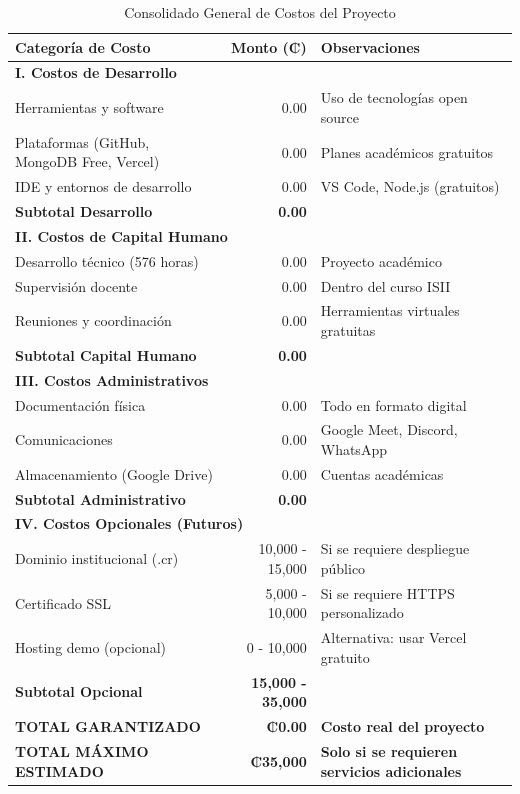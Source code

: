 \begin{table}[H]
\centering
\begin{tabular}{|l|r|p{5cm}|}
\hline
\textbf{Categoría de Costo} & \textbf{Monto (₡)} & \textbf{Observaciones} \\
\hline
\hline
\multicolumn{3}{|l|}{\textbf{I. Costos de Desarrollo}} \\
\hline
Herramientas y software & 0.00 & Uso de tecnologías open source \\
Plataformas (GitHub, MongoDB Free, Vercel) & 0.00 & Planes académicos gratuitos \\
IDE y entornos de desarrollo & 0.00 & VS Code, Node.js (gratuitos) \\
\hline
\textbf{Subtotal Desarrollo} & \textbf{0.00} & \\
\hline
\hline
\multicolumn{3}{|l|}{\textbf{II. Costos de Capital Humano}} \\
\hline
Desarrollo técnico (576 horas) & 0.00 & Proyecto académico \\
Supervisión docente & 0.00 & Dentro del curso ISII \\
Reuniones y coordinación & 0.00 & Herramientas virtuales gratuitas \\
\hline
\textbf{Subtotal Capital Humano} & \textbf{0.00} & \\
\hline
\hline
\multicolumn{3}{|l|}{\textbf{III. Costos Administrativos}} \\
\hline
Documentación física & 0.00 & Todo en formato digital \\
Comunicaciones & 0.00 & Google Meet, Discord, WhatsApp \\
Almacenamiento (Google Drive) & 0.00 & Cuentas académicas \\
\hline
\textbf{Subtotal Administrativo} & \textbf{0.00} & \\
\hline
\hline
\multicolumn{3}{|l|}{\textbf{IV. Costos Opcionales (Futuros)}} \\
\hline
Dominio institucional (.cr) & 10,000 - 15,000 & Si se requiere despliegue público \\
Certificado SSL & 5,000 - 10,000 & Si se requiere HTTPS personalizado \\
Hosting demo (opcional) & 0 - 10,000 & Alternativa: usar Vercel gratuito \\
\hline
\textbf{Subtotal Opcional} & \textbf{15,000 - 35,000} & \\
\hline
\hline
\textbf{TOTAL GARANTIZADO} & \textbf{₡0.00} & \textbf{Costo real del proyecto} \\
\textbf{TOTAL MÁXIMO ESTIMADO} & \textbf{₡35,000} & \textbf{Solo si se requieren servicios adicionales} \\
\hline
\end{tabular}
\caption{Consolidado General de Costos del Proyecto}
\label{tab:costos_consolidado}
\end{table}

